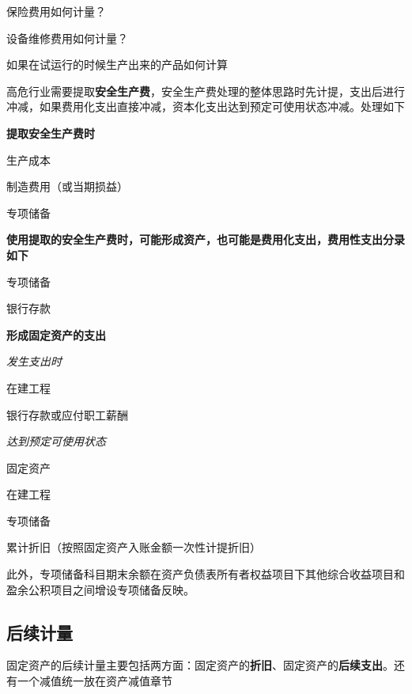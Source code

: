 \documentclass[UTF8,12pt]{ctexart}
\newenvironment{Dr}{%
	\begin{list}{}%
		{
			\setlength{\leftmargin}{2em}
			\setlength{\labelwidth}{2em}
			\setlength{\labelsep}{0pt}
			\setlength{\itemindent}{0pt}
			\setlength{\listparindent}{0pt}
			\setlength{\parsep}{0pt}
			\setlength{\topsep}{0pt}
		}
		\item[\textbf{借：}]
	}{%
	\end{list}
}
\newenvironment{Cr}{%
	\begin{list}{}%
		{
			\setlength{\leftmargin}{2em}
			\setlength{\labelwidth}{2em}
			\setlength{\labelsep}{0pt}
			\setlength{\itemindent}{0pt}
			\setlength{\listparindent}{0pt}
			\setlength{\parsep}{0pt}
			\setlength{\topsep}{0pt}
		}
		\item[\textbf{贷：}]
	}{%
	\end{list}
}
\numberwithin{equation}{section} %
\numberwithin{figure}{section}
\numberwithin{table}{section}
\begin{document}
	保险费用如何计量？
	
	设备维修费用如何计量？
	
	如果在试运行的时候生产出来的产品如何计算
	
	高危行业需要提取\textbf{安全生产费}，安全生产费处理的整体思路时先计提，支出后进行冲减，如果费用化支出直接冲减，资本化支出达到预定可使用状态冲减。处理如下
	
	\textbf{提取安全生产费时}
	
	\begin{Dr}
		生产成本
		
		制造费用（或当期损益）
	\end{Dr}
	\begin{Cr}
		专项储备
	\end{Cr}
	
	
	\textbf{使用提取的安全生产费时，可能形成资产，也可能是费用化支出，费用性支出分录如下}
	
	\begin{Dr}
		专项储备
	\end{Dr}
	\begin{Cr}
		银行存款
	\end{Cr}
	
	\textbf{形成固定资产的支出}
	
	\textit{发生支出时}
	
	\begin{Dr}
		在建工程
	\end{Dr}
	\begin{Cr}
		银行存款或应付职工薪酬
	\end{Cr}
	
	\textit{达到预定可使用状态}
	
	\begin{Dr}
		固定资产
	\end{Dr}
	\begin{Cr}
		在建工程
	\end{Cr}
	
	\begin{Dr}
		专项储备
	\end{Dr}
	\begin{Cr}
		累计折旧（按照固定资产入账金额一次性计提折旧）
	\end{Cr}
	
	此外，专项储备科目期末余额在资产负债表所有者权益项目下其他综合收益项目和盈余公积项目之间增设专项储备反映。
	
	
	
	\subsection{后续计量}
	固定资产的后续计量主要包括两方面：固定资产的\textbf{折旧}、固定资产的\textbf{后续支出}。还有一个减值统一放在资产减值章节
	
\end{document}
